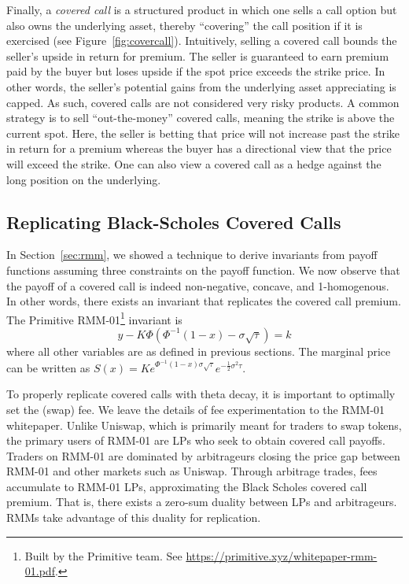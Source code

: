 \documentclass[hidelinks, 12pt]{article}
\begin{document}
Finally, a \textit{covered call} is a structured product in which one sells a call option but also owns the underlying asset, thereby ``covering'' the call position if it is exercised (see Figure~\ref{fig:covercall}). Intuitively, selling a covered call bounds the seller's upside in return for premium. The seller is guaranteed to earn premium paid by the buyer but loses upside if the spot price exceeds the strike price. In other words, the seller's potential gains from the underlying asset appreciating is capped. As such, covered calls are not considered very risky products. A common strategy is to sell ``out-the-money'' covered calls, meaning the strike is above the current spot. Here, the seller is betting that price will not increase past the strike in return for a premium whereas the buyer has a directional view that the price will exceed the strike. One can also view a covered call as a hedge against the long position on the underlying.

\subsection{Replicating Black-Scholes Covered Calls}
\label{sec:coveredcall}

In Section~\ref{sec:rmm}, we showed a technique to derive invariants from payoff functions assuming three constraints on the payoff function. We now observe that the payoff of a covered call is indeed non-negative, concave, and 1-homogenous. In other words, there exists an invariant that replicates the covered call premium. The Primitive RMM-01\footnote{Built by the Primitive team. See \url{https://primitive.xyz/whitepaper-rmm-01.pdf}.} invariant is
\begin{equation}
    y - K\Phi(\Phi^{-1}(1-x)-\sigma\sqrt{\tau}) = k
\label{eq:invariant}
\end{equation}
where all other variables are as defined in previous sections. The marginal price can be written as $S(x) = Ke^{\Phi^{-1}(1-x)\sigma\sqrt{\tau}}e^{-\frac{1}{2}\sigma^2\tau}$.

To properly replicate covered calls with theta decay, it is important to optimally set the (swap) fee. We leave the details of fee experimentation to the RMM-01 whitepaper. Unlike Uniswap, which is primarily meant for traders to swap tokens, the primary users of RMM-01 are LPs who seek to obtain covered call payoffs. Traders on RMM-01 are dominated by arbitrageurs closing the price gap between RMM-01 and other markets such as Uniswap. Through arbitrage trades, fees accumulate to RMM-01 LPs, approximating the Black Scholes covered call premium. That is, there exists a zero-sum duality between LPs and arbitrageurs. RMMs take advantage of this duality for replication.
\end{document}
